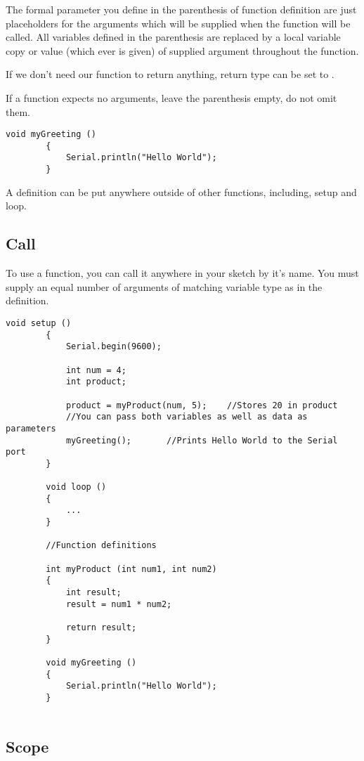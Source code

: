 \documentclass{article}
\begin{document}
		The formal parameter you define in the parenthesis of function definition are just placeholders for the arguments which will be supplied when the function will be called. All variables defined in the parenthesis are replaced by a local variable copy or value (which ever is given) of supplied argument throughout the function.

		If we don't need our function to return anything, return type can be set to .

		If a function expects no arguments, leave the parenthesis empty, do not omit them.
		
		\begin{lstlisting}[gobble=8]
		void myGreeting ()
		{
			Serial.println("Hello World");
		}
		\end{lstlisting}

		A definition can be put anywhere outside of other functions, including, setup and loop.

	\subsection{Call}

		To use a function, you can call it anywhere in your sketch by it's name. You must supply an equal number of arguments of matching variable type as in the definition.

		\begin{lstlisting}[gobble=8]
		void setup ()
		{
			Serial.begin(9600);

			int num = 4;
			int product;

			product = myProduct(num, 5);	//Stores 20 in product
			//You can pass both variables as well as data as parameters
			myGreeting();		//Prints Hello World to the Serial port
		}

		void loop ()
		{
			...
		}

		//Function definitions

		int myProduct (int num1, int num2)
		{
			int result;
			result = num1 * num2;

			return result;
		}

		void myGreeting ()
		{
			Serial.println("Hello World");
		}
		
		\end{lstlisting}

	\subsection{Scope}
\end{document}
